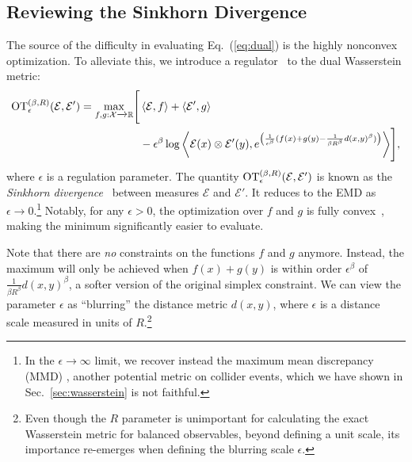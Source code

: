 \documentclass[letterpaper,11pt]{article}
\newcommand{\E}{\mathcal{E}}
\DeclareRobustCommand{\Sec}[1]{Sec.~\ref{sec:#1}}
\DeclareRobustCommand{\Eq}[1]{Eq.~(\ref{eq:#1})}
\begin{document}
\subsection{Reviewing the Sinkhorn Divergence}\label{sec:sinkhorn}


The source of the difficulty in evaluating \Eq{dual} is the highly nonconvex optimization. To alleviate this, we introduce a regulator~\cite{cuturi2013sinkhorn, CLASON2021124432} to the dual Wasserstein metric:
%
\begin{align}
    {\rm OT}^{(\beta,R)}_\epsilon(\E, \E') = \max_{f, g:\mathcal{X}\xrightarrow[]{}\mathbb{R}} \Biggl[&\expval{\E, f} +\expval{\E',g} \nonumber\\&- \epsilon^\beta\log\expval{\E(x) \otimes \E'(y), e^{\left(\frac{1}{\epsilon^\beta}(f(x) + g(y) - \frac{1}{\beta R^\beta}d(x,y)^\beta)\right)}}\Biggr] , \label{eq:sinkhorn_dual}
\end{align}
%
where $\epsilon$ is a regulation parameter. The quantity ${\rm OT}^{(\beta,R)}_{\epsilon}(\E, \E')$ is known as the \emph{Sinkhorn divergence}~\cite{sinkhorn_1966} between measures $\E$ and $\E'$. It reduces to the EMD as $\epsilon\to0$.\footnote{In the $\epsilon \to \infty$ limit, we recover instead the maximum mean discrepancy (MMD) \cite{ramdas2017wasserstein}, another potential metric on collider events, which we have shown in \Sec{wasserstein} is not faithful.}  Notably, for any $\epsilon > 0$, the optimization over $f$ and $g$ is fully convex~\cite{feydy_20}, making the minimum significantly easier to evaluate. 


Note that there are \emph{no} constraints on the functions $f$ and $g$ anymore. Instead, the maximum will only be achieved when $f(x) + g(y)$ is within order $\epsilon^\beta$ of $\frac{1}{\beta R^\beta}d(x,y)^\beta$, a softer version of the original simplex constraint. We can view the parameter $\epsilon$ as ``blurring'' the distance metric $d(x,y)$, where $\epsilon$ is a distance scale measured in units of $R$.\footnote{Even though the $R$ parameter is unimportant for calculating the exact Wasserstein metric for balanced observables, beyond defining a unit scale, its importance re-emerges when defining the blurring scale $\epsilon$.} 
\end{document}
